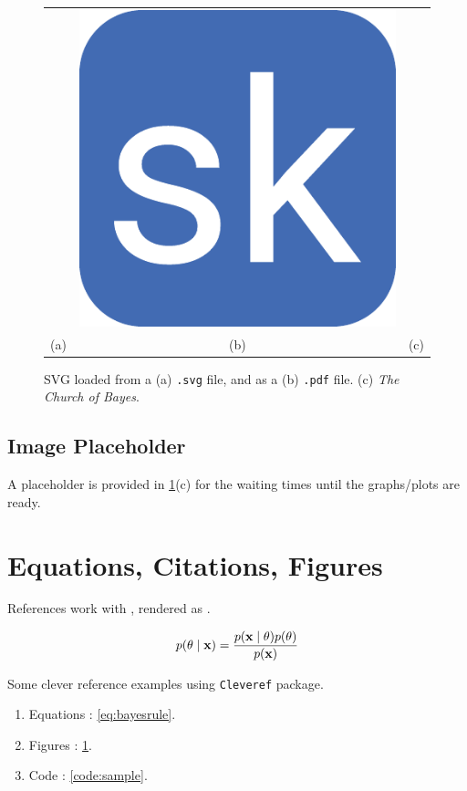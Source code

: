 \documentclass{article}
\begin{document}
\begin{figure}[ht]
    \centering
    \begin{tabular}{ccc}
         & \includegraphics[width=0.15\linewidth]{favicon.pdf} &
         \\
        (a) & (b) & (c)
    \end{tabular}
    \caption{SVG loaded from a (a) \texttt{.svg} file, and as a (b) \texttt{.pdf} file. (c) \emph{The Church of Bayes}. }
    \label{fig:svg_pdf}
\end{figure}    

\subsection{Image Placeholder}

A placeholder is provided in \cref{fig:svg_pdf}(c) for the waiting times until the graphs/plots are ready.

\section{Equations, Citations, Figures}

References work with , rendered as \citet{kapoor2020variational}.

\begin{align}
p(\theta \mid {\ensuremath{\boldsymbol{\mathbf{x}}}}) = \frac{p({\boldsymbol{\mathbf{x}}}\mid\theta)p(\theta)}{p({\boldsymbol{\mathbf{x}}})} \label{eq:bayesrule}
\end{align}

Some clever reference examples using \texttt{Cleveref} package.

\begin{enumerate}
\item Equations : \cref{eq:bayesrule}.
\item Figures : \cref{fig:svg_pdf}.
\item Code : \cref{code:sample}.
\end{enumerate}
\end{document}
